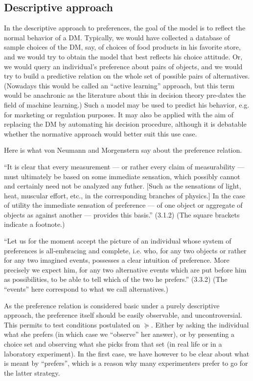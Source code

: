 \documentclass[french, english]{llncs}
\begin{document}
	\subsection{Descriptive approach}
	In the descriptive approach to preferences, the goal of the model is to reflect the normal behavior of a \ac{DM}. Typically, we would have collected a database of sample choices of the \ac{DM}, say, of choices of food products in his favorite store, and we would try to obtain the model that best reflects his choice attitude. Or, we would query an individual’s preference about pairs of objects, and we would try to build a predictive relation on the whole set of possible pairs of alternatives. (Nowadays this would be called an “active learning” approach, but this term would be anachronic as the literature about this in decision theory pre-dates the field of machine learning.) Such a model may be used to predict his behavior, e.g. for marketing or regulation purposes. It may also be applied with the aim of replacing the \ac{DM} by automating his decision procedure, although it is debatable whether the normative approach would better suit this use case.
	
	Here is what von Neumann and Morgenstern say about the preference relation.
	
	“It is clear that every measurement --- or rather every claim of measurability --- must ultimately be based on some immediate sensation, which possibly cannot and certainly need not be analyzed any futher.
	[Such as the sensations of light, heat, muscular effort, etc., in the corresponding branches of physics.] 
	In the case of utility the immediate sensation of preference --- of one object or aggregate of objects as against another --- provides this basis.” (3.1.2) (The square brackets indicate a footnote.)
	
	“Let us for the moment accept the picture of an individual whose system of preferences is all-embracing and complete, i.e. who, for any two objects or rather for any two imagined events, possesses a clear intuition of preference. More precisely we expect him, for any two alternative events which are put before him as possibilities, to be able to tell which of the two he prefers.” (3.3.2) (The “events” here correspond to what we call alternatives.)
	
	As the preference relation is considered basic under a purely descriptive approach, the preference itself should be easily observable, and uncontroversial. This permits to test conditions postulated on $\succeq$. Either by asking the individual what she prefers (in which case we “observe” her answer), or by presenting a choice set and observing what she picks from that set (in real life or in a laboratory experiment). In the first case, we have however to be clear about what is meant by “prefers”, which is a reason why many experimenters prefer to go for the latter strategy.
	
\end{document}
